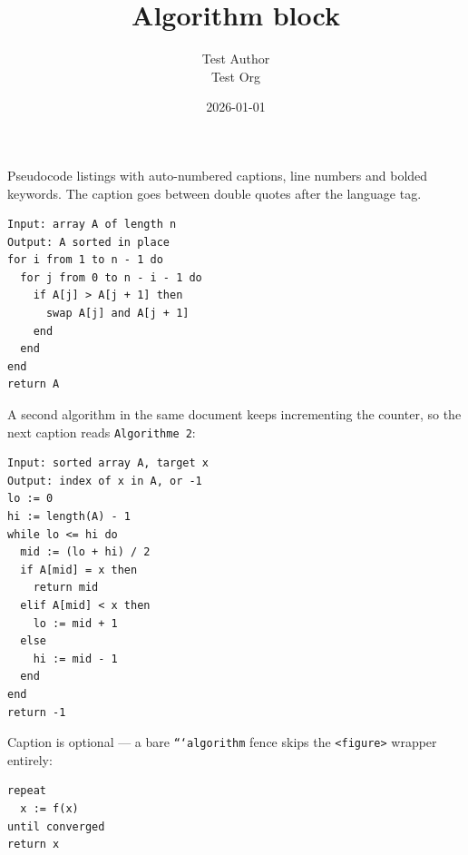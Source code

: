 \documentclass[11pt,a4paper]{article}
\title{Algorithm block}
\author{Test Author \\ Test Org}
\date{2026-01-01}
\theoremstyle{definition}
\begin{document}
\maketitle

Pseudocode listings with auto-numbered captions, line numbers and
bolded keywords. The caption goes between double quotes after the
language tag.


\begin{lstlisting}
Input: array A of length n
Output: A sorted in place
for i from 1 to n - 1 do
  for j from 0 to n - i - 1 do
    if A[j] > A[j + 1] then
      swap A[j] and A[j + 1]
    end
  end
end
return A
\end{lstlisting}


A second algorithm in the same document keeps incrementing the
counter, so the next caption reads \texttt{Algorithme 2}:


\begin{lstlisting}
Input: sorted array A, target x
Output: index of x in A, or -1
lo := 0
hi := length(A) - 1
while lo <= hi do
  mid := (lo + hi) / 2
  if A[mid] = x then
    return mid
  elif A[mid] < x then
    lo := mid + 1
  else
    hi := mid - 1
  end
end
return -1
\end{lstlisting}


Caption is optional — a bare \texttt{```algorithm} fence skips the
\texttt{<figure>} wrapper entirely:


\begin{lstlisting}
repeat
  x := f(x)
until converged
return x
\end{lstlisting}
\end{document}
